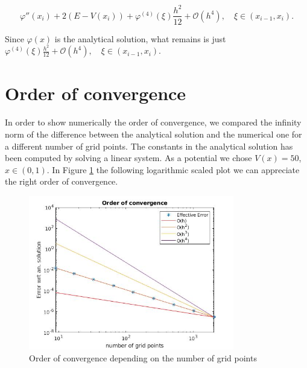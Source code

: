 \documentclass[12pt,a4paper,onecolumn]{article}
\theoremstyle{definition}
\theoremstyle{plain}
\newcommand{\var}{\varphi}
\begin{document}
\[ \var ''(x_i)+2(E-V(x_i))+ \var^{(4)}(\xi) \frac{h^2}{12}+\mathcal{O}(h^4), \quad \xi \in (x_{i-1},x_i).\]

Since $\var(x)$ is the analytical solution, what remains is just $ \var^{(4)}(\xi) \frac{h^2}{12}+\mathcal{O}(h^4), \quad \xi \in (x_{i-1},x_i)$.

\section{Order of convergence}

In order to show numerically the order of convergence, we compared the infinity norm of the difference between the analytical solution and the numerical one for a different number of grid points. The constants in the analytical solution has been computed by solving a linear system. 
As a potential we chose  $V(x)=50$, $ x \in (0,1)$. In Figure \ref {fig:OrderConst} the following logarithmic scaled plot we can appreciate the right order of convergence.

\begin{figure}[h]

	 \centering
	  \includegraphics[width=0.8\textwidth]{OrderConst.jpg}
	  \caption{Order of convergence depending on the number of grid points}
	  \label{fig:OrderConst}
\end{figure}
\end{document}
